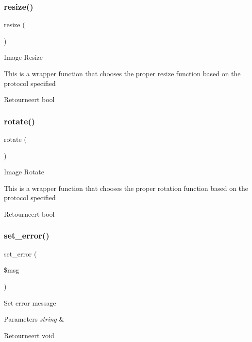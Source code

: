 \subsubsection{\texorpdfstring{resize()}{resize()}}
{\footnotesize\ttfamily resize (\begin{DoxyParamCaption}{ }\end{DoxyParamCaption})}

Image Resize

This is a wrapper function that chooses the proper resize function based on the protocol specified

\begin{DoxyReturn}{Retourneert}
bool 
\end{DoxyReturn}
\mbox{\label{class_c_i___image__lib_a74e94d71195d9cbb9c9e3bca3353d912}} 
\subsubsection{\texorpdfstring{rotate()}{rotate()}}
{\footnotesize\ttfamily rotate (\begin{DoxyParamCaption}{ }\end{DoxyParamCaption})}

Image Rotate

This is a wrapper function that chooses the proper rotation function based on the protocol specified

\begin{DoxyReturn}{Retourneert}
bool 
\end{DoxyReturn}
\mbox{\label{class_c_i___image__lib_a892f1ba7cba3731a3fc68f1f64e92610}} 
\subsubsection{\texorpdfstring{set\_error()}{set\_error()}}
{\footnotesize\ttfamily set\+\_\+error (\begin{DoxyParamCaption}\item[{}]{\$msg }\end{DoxyParamCaption})}

Set error message


\begin{DoxyParams}{Parameters}
{\em string} & \\
\hline
\end{DoxyParams}
\begin{DoxyReturn}{Retourneert}
void 
\end{DoxyReturn}
\mbox{\label{class_c_i___image__lib_a827549db4de2281a8f2b35ada2ef3909}} 
